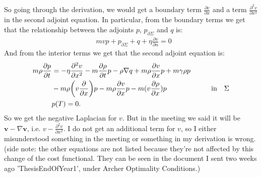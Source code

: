 \documentclass[11pt, a4paper]{article}
\theoremstyle{definition}
\newcommand{\Sta}{\rho}
\newcommand{\Stav}{\mathbf{v}}
\newcommand{\Adjb}{q}
\newcommand{\Adjc}{p_{\partial \Sigma}}
\begin{document}
	So going through the derivation, we would get a boundary term $\frac{\partial v}{\partial x}$ and a term $\frac{\partial^2 v}{\partial x^2} $ in the second adjoint equation.
	In particular, from the boundary terms we get that the relationship between the adjoints $p$, $\Adjc$ and $q$ is:
	\begin{align*}
	& m v p +  \Adjc + \Adjb + \eta\frac{\partial v}{\partial n} =0
	\end{align*}
	And from the interior terms we get that the second adjoint equation is:
	\begin{align}
	 m\Sta \frac{\partial p}{\partial t}  &= -\eta \frac{\partial^2 v}{\partial x^2}    - m \frac{\partial \Sta}{\partial t} p  
	-\Sta\nabla \Adjb +m \Sta \frac{\partial v}{\partial x} p +m \gamma \Sta p \\
	&-m \Sta \bigg(v \frac{\partial}{\partial x}\bigg)p - m \Sta \frac{\partial v}{\partial x}p  - m (v  \frac{\partial \rho}{\partial x})p\ \qquad\qquad \qquad\text{in} \quad \Sigma \notag \\
	&p(T)=0. \notag
	\end{align}
	So we get the negative Laplacian for $v$. But in the meeting we said it will be $\Stav - \nabla \Stav$, i.e. $v - \frac{\partial^2 v}{\partial x^2}$. I do not get an additional term for $v$, so I either misunderstood something in the meeting or something in my derivation is wrong.
	(side note: the other equations are not listed because they're not affected by this change of the cost functional. They can be seen in the document I sent two weeks ago 'ThesisEndOfYear1', under Archer Optimality Conditions.)
	
\end{document}
